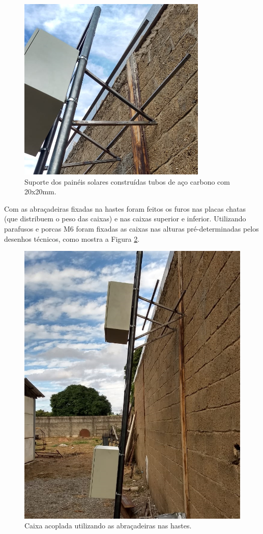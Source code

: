 \begin{figure}[H]
	\centering
    \includegraphics[keepaspectratio=true,scale=0.8]{figuras/suporte_painel2}
    \caption{Suporte dos painéis solares construídas tubos de aço carbono com 20x20mm.}
    \label{supaisolcons}
\end{figure}

Com as abraçadeiras fixadas na hastes foram feitos os furos nas placas chatas (que distribuem o peso das caixas) e nas caixas superior e inferior. Utilizando parafusos e porcas M6 foram fixadas as caixas nas alturas pré-determinadas pelos desenhos técnicos, como mostra a Figura \ref{caixaacop}.

\begin{figure}[H]
	\centering
    \includegraphics[keepaspectratio=true,scale=0.35]{figuras/caixa_completa_com_hastes}
    \caption{Caixa acoplada utilizando as abraçadeiras nas hastes.}
    \label{caixaacop}
\end{figure}


